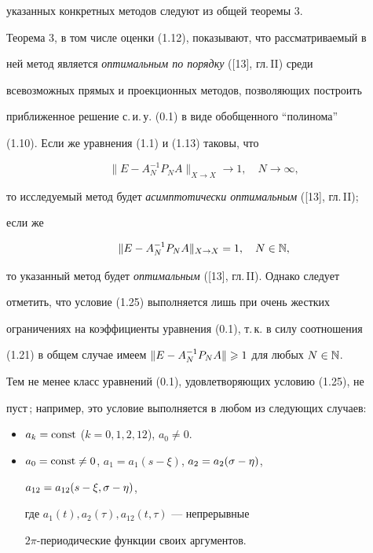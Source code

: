 указанных конкретных методов следуют из общей теоремы 3.





Теорема 3, в том числе оценки (1.12), показывают, что рассматриваемый в 


ней метод является {\it оптимальным по порядку} ([13], гл.\,II) среди 


всевозможных прямых и проекционных методов, позволяющих построить 


приближенное решение с.\,и.\,у. (0.1) в виде обобщенного ``полинома''


(1.10). Если же уравнения (1.1) и (1.13) таковы, что 


\begin{equation}


\|E - A_N^{-1}P_N A\|_{X\to X} \rightarrow 1,\quad N\to \infty,


\end{equation}


то исследуемый метод будет {\it асимптотически оптимальным} ([13], гл.\,II);


если же


\begin{equation}


\|E - A_N^{-1}P_N A\|_{X\to X} = 1,\quad N\in \N,


\end{equation}


то указанный метод будет {\it оптимальным} ([13], гл.\,II). Однако следует 


отметить, что условие (1.25) выполняется лишь при очень жестких 


ограничениях на коэффициенты уравнения (0.1), т.\,к. в силу соотношения 


(1.21) в общем случае имеем $\|E-A_N^{-1}P_N A\|\geqslant 1$ для любых $N\in\Bbb N$. 


Тем не менее класс уравнений (0.1), удовлетворяющих условию (1.25), не 


пуст\,; например, это условие выполняется в любом из следующих случаев:


\begin{itemize}


\item[1)] $a_k = \operatorname{const}$ ($k=0,1,2,12$), $a_0\ne 0$.


\item[2)] $a_0 = \operatorname{const} \ne 0$, $a_1 = a_1(s-\xi)$, $a_2 = a_2(\sigma-\eta)$,


$a_{12} = a_{12}(s-\xi,\sigma-\eta)$, 


где $a_1(t), a_2(\tau), a_{12}(t,\tau)$ --- непрерывные 


$2\pi$-периодические функции своих аргументов. 


\end{itemize}





